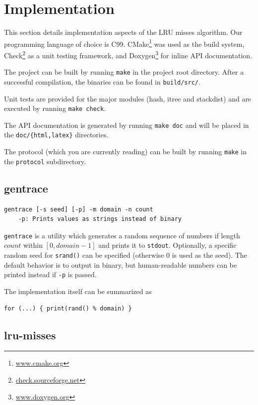\documentclass[a4paper,10pt]{article}
\begin{document}
\section{Implementation}

This section details implementation aspects of the LRU misses algorithm.
Our programming language of choice is C99. CMake\footnote{\url{www.cmake.org}} was used as the build system, Check\footnote{\url{check.sourceforge.net}} as a unit testing framework, and Doxygen\footnote{\url{www.doxygen.org}} for inline API documentation.

The project can be built by running \verb|make| in the project root directory. After a successful compilation, the binaries can be found in \verb|build/src/|.

Unit tests are provided for the major modules (hash, itree and stackdist) and are executed by running \verb|make check|.

The API documentation is generated by running \verb|make doc| and will be
placed in the \verb|doc/{html,latex}| directories.

The protocol (which you are currently reading) can be built by running
\verb|make| in the \verb|protocol| subdirectory.

\subsection{gentrace}

\begin{verbatim}
gentrace [-s seed] [-p] -m domain -n count
    -p: Prints values as strings instead of binary
\end{verbatim}

\verb|gentrace| is a utility which generates a random sequence of numbers
if length $count$ within $[0, domain - 1]$ and prints it to \lstinline|stdout|. Optionally, a specific
random seed for \lstinline|srand()| can be specified (otherwise $0$ is
used as the seed). The default behavior is to output in binary, but
human-readable numbers can be printed instead if \verb|-p| is passed.

The implementation itself can be summarized as

\begin{lstlisting}
for (...) { print(rand() % domain) }
\end{lstlisting}

\subsection{lru-misses}
\end{document}
